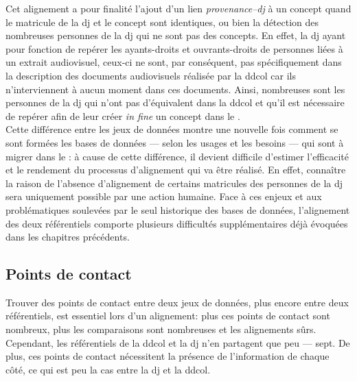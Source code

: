 Cet alignement a pour finalité l'ajout d'un lien \textit{provenance--\ac{dj}} à un concept quand le matricule de la \ac{dj} et le concept sont identiques, ou bien la détection des nombreuses personnes de la \ac{dj} qui ne sont pas des concepts. En effet, la \ac{dj} ayant pour fonction de repérer les ayants-droits et ouvrants-droits de personnes liées à un extrait audiovisuel, ceux-ci ne sont, par conséquent, pas spécifiquement dans la description des documents audiovisuels réalisée par la \ac{ddcol} car ils n'interviennent à aucun moment dans ces documents. Ainsi, nombreuses sont les personnes de la \ac{dj} qui n'ont pas d'équivalent dans la \ac{ddcol} et qu'il est nécessaire de repérer afin de leur créer \textit{in fine} un concept dans le \ldd.\\

Cette différence entre les jeux de données montre une nouvelle fois comment se sont formées les bases de données --- selon les usages et les besoins --- qui sont à migrer dans le \ldd: à cause de cette différence, il devient difficile d'estimer l'efficacité et le rendement du processus d'alignement qui va être réalisé. En effet, connaître la raison de l'absence d'alignement de certains matricules des personnes de la \ac{dj} sera uniquement possible par une action humaine. Face à ces enjeux et aux problématiques soulevées par le seul historique des bases de données, l'alignement des deux référentiels comporte plusieurs difficultés supplémentaires déjà évoquées dans les chapitres précédents.

\subsection{\label{III-C-1-b}Points de contact}

Trouver des points de contact entre deux jeux de données, plus encore entre deux référentiels, est essentiel lors d'un alignement: plus ces points de contact sont nombreux, plus les comparaisons sont nombreuses et les alignements sûrs. Cependant, les référentiels de la \ac{ddcol} et la \ac{dj} n'en partagent que peu --- sept. De plus, ces points de contact nécessitent la présence de l'information de chaque côté, ce qui est peu la cas entre la \ac{dj} et la \ac{ddcol}.\\

